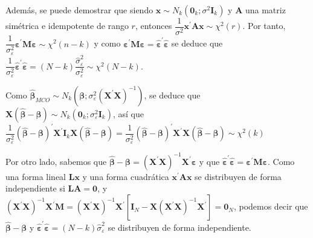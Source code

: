 Adem\'as, se puede demostrar que siendo $\boldsymbol{x}\sim N_{k}\left(\boldsymbol{0}_{k};\sigma^{2}\boldsymbol{I}_{k}\right)$
y $\boldsymbol{A}$ una matriz sim\'etrica e idempotente de rango $r$,
entonces $\dfrac{1}{\sigma^{2}}\boldsymbol{x}^{\prime}\boldsymbol{A}\boldsymbol{x}\sim\chi^{2}(r)$.
Por tanto,  $\dfrac{1}{\sigma^{2}_{\varepsilon}}\boldsymbol{\varepsilon}^{\prime}\boldsymbol{M}\boldsymbol{\varepsilon}\sim\chi^{2}(n-k)$ y como $\boldsymbol{\varepsilon}^{\prime}\boldsymbol{M}\boldsymbol{\varepsilon}=\hat{\boldsymbol{\varepsilon}}^{\prime}\hat{\boldsymbol{\varepsilon}}$
se deduce que $\dfrac{1}{\sigma_{\varepsilon}^{2}}\hat{\boldsymbol{\varepsilon}}^{\prime}\hat{\boldsymbol{\varepsilon}}=\left(N-k\right)\dfrac{\hat{\sigma}_{\varepsilon}^{2}}{\sigma_{\varepsilon}^{2}}\sim\chi^{2}(N-k)$.

Como $\hat{\boldsymbol{\beta}}_{MCO}\sim N_{k}\left(\boldsymbol{\beta};\sigma_{\varepsilon}^{2}\left(\boldsymbol{X}^{\prime}\boldsymbol{X}\right)^{-1}\right)$,
se deduce que $\boldsymbol{X}\left(\hat{\boldsymbol{\beta}}-\boldsymbol{\beta}\right)\sim N_{k}\left(\boldsymbol{0}_{k};\sigma_{\varepsilon}^{2}\boldsymbol{I}_{k}\right)$,
as\'i que $\dfrac{1}{\sigma_{\varepsilon}^{2}}\left(\hat{\boldsymbol{\beta}}-\boldsymbol{\beta}\right)^{\prime}\boldsymbol{X}^{\prime}\boldsymbol{I}_{k}\boldsymbol{X}\left(\hat{\boldsymbol{\beta}}-\boldsymbol{\beta}\right)=\dfrac{1}{\sigma_{\varepsilon}^{2}}\left(\hat{\boldsymbol{\beta}}-\boldsymbol{\beta}\right)^{\prime}\boldsymbol{X}^{\prime}\boldsymbol{X}\left(\hat{\boldsymbol{\beta}}-\boldsymbol{\beta}\right)\sim\chi^{2}(k)$

Por otro lado, sabemos que $\hat{\boldsymbol{\beta}}-\boldsymbol{\beta}=\left(\boldsymbol{X}^{\prime}\boldsymbol{X}\right)^{-1}\boldsymbol{X}^{\prime}\boldsymbol{\varepsilon}$
y que $\hat{\boldsymbol{\varepsilon}}^{\prime}\hat{\boldsymbol{\varepsilon}}=\boldsymbol{\varepsilon}^{\prime}\boldsymbol{M}\boldsymbol{\varepsilon}$.
Como una forma lineal $\boldsymbol{L}\boldsymbol{x}$ y una forma
cuadr\'atica $\boldsymbol{x}^{\prime}\boldsymbol{A}\boldsymbol{x}$ se distribuyen
de forma independiente si $\boldsymbol{LA}=\boldsymbol{0}$, y $\left(\boldsymbol{X}^{\prime}\boldsymbol{X}\right)^{-1}\boldsymbol{X}^{\prime}\boldsymbol{M}=\left(\boldsymbol{X}^{\prime}\boldsymbol{X}\right)^{-1}\boldsymbol{X}^{\prime}\left[\boldsymbol{I}_{N}-\boldsymbol{X}\left(\boldsymbol{X}^{\prime}\boldsymbol{X}\right)^{-1}\boldsymbol{X}^{\prime}\right]=\boldsymbol{0}_{N}$,
podemos decir que $\hat{\boldsymbol{\beta}}-\boldsymbol{\beta}$ y
$\hat{\boldsymbol{\varepsilon}}^{\prime}\hat{\boldsymbol{\varepsilon}}=\left(N-k\right)\hat{\sigma}_{\varepsilon}^{2}$
se distribuyen de forma independiente.

